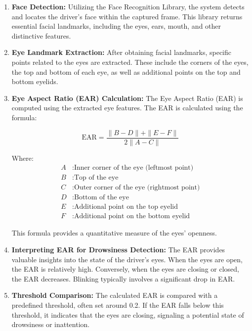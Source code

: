 \documentclass[letterpaper, 10 pt, conference]{ieeeconf}  %
\begin{document}
\begin{enumerate}
    \item \textbf{Face Detection:} Utilizing the Face Recognition Library, the system detects and locates the driver's face within the captured frame. This library returns essential facial landmarks, including the eyes, ears, mouth, and other distinctive features.
    
    \item \textbf{Eye Landmark Extraction:} After obtaining facial landmarks, specific points related to the eyes are extracted. These include the corners of the eyes, the top and bottom of each eye, as well as additional points on the top and bottom eyelids.

    \item \textbf{Eye Aspect Ratio (EAR) Calculation:} The Eye Aspect Ratio (EAR) is computed using the extracted eye features. The EAR is calculated using the formula:
    
    \[
    \text{EAR} = \frac{{\|B - D\| + \|E - F\|}}{{2 \|A - C\|}}
    \]

    Where:
    \begin{align*}
    A & : \text{Inner corner of the eye (leftmost point)} \\
    B & : \text{Top of the eye} \\
    C & : \text{Outer corner of the eye (rightmost point)} \\
    D & : \text{Bottom of the eye} \\
    E & : \text{Additional point on the top eyelid} \\
    F & : \text{Additional point on the bottom eyelid}
    \end{align*}

    This formula provides a quantitative measure of the eyes' openness.

    \item \textbf{Interpreting EAR for Drowsiness Detection:} The EAR provides valuable insights into the state of the driver's eyes. When the eyes are open, the EAR is relatively high. Conversely, when the eyes are closing or closed, the EAR decreases. Blinking typically involves a significant drop in EAR.

    \item \textbf{Threshold Comparison:} The calculated EAR is compared with a predefined threshold, often set around 0.2. If the EAR falls below this threshold, it indicates that the eyes are closing, signaling a potential state of drowsiness or inattention.


\end{enumerate}
\end{document}

